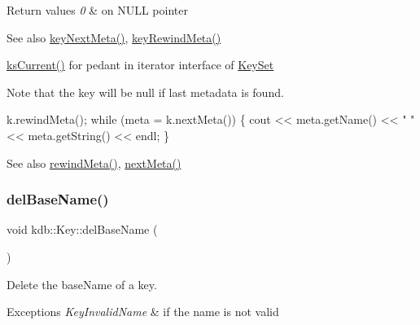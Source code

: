 \begin{DoxyRetVals}{Return values}
{\em 0} & on N\+U\+LL pointer \\
\hline
\end{DoxyRetVals}
\begin{DoxySeeAlso}{See also}
\hyperlink{group__keymeta_ga4c88342f580a4291455a801af71ce048}{key\+Next\+Meta()}, \hyperlink{group__keymeta_ga5dbb669802eea27e106ee3a5e39717a9}{key\+Rewind\+Meta()}

\hyperlink{group__keyset_ga4287b9416912c5f2ab9c195cb74fb094}{ks\+Current()} for pedant in iterator interface of \hyperlink{classkdb_1_1KeySet}{Key\+Set}
\end{DoxySeeAlso}
\begin{DoxyNote}{Note}
that the key will be null if last metadata is found.
\end{DoxyNote}

\begin{DoxyCode}
k.rewindMeta();
\textcolor{keywordflow}{while} (meta = k.nextMeta())
\{
        cout << meta.getName() << \textcolor{stringliteral}{" "} << meta.getString() << endl;
\}
\end{DoxyCode}


\begin{DoxySeeAlso}{See also}
\hyperlink{classkdb_1_1Key_a002af206119ceed17b106e2449cedc91}{rewind\+Meta()}, \hyperlink{classkdb_1_1Key_a855f37fef58a4ea4006d9e281f66cfe1}{next\+Meta()} 
\end{DoxySeeAlso}
\mbox{\label{classkdb_1_1Key_aec6af8723a31af40f9a16614ea46c341}} 
\subsubsection{\texorpdfstring{del\+Base\+Name()}{delBaseName()}}
{\footnotesize\ttfamily void kdb\+::\+Key\+::del\+Base\+Name (\begin{DoxyParamCaption}{ }\end{DoxyParamCaption})\hspace{0.3cm}{\ttfamily [inline]}}



Delete the base\+Name of a key. 


\begin{DoxyExceptions}{Exceptions}
{\em Key\+Invalid\+Name} & if the name is not valid \\
\hline
\end{DoxyExceptions}
\mbox{\label{classkdb_1_1Key_a2305da805095605aca38d53f2733fb57}} 
